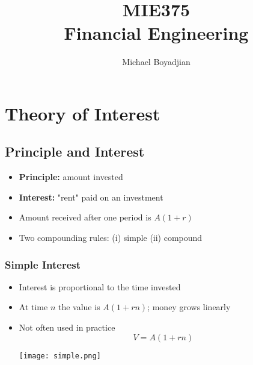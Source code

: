 \documentclass[11pt]{article}
\begin{document}
\title{MIE375  \\ Financial Engineering}
\author{Michael Boyadjian}
\maketitle
\pagebreak

\tableofcontents

\pagebreak

\bigskip
\bigskip
\bigskip

\section{Theory of Interest}

\subsection{Principle and Interest}
\begin{itemize}
\item \textbf{Principle:} amount invested
\item\textbf{Interest: }"rent" paid on an investment
\item Amount received after one period is $A(1+r)$
\item Two compounding rules: (i) simple (ii) compound
\end{itemize}

\subsubsection{Simple Interest}
\begin{itemize}
\item Interest is proportional to the time invested
\item At time $n$ the value is $A(1+rn)$; money grows linearly
\item Not often used in practice
$$ V = A(1+rn)$$
\begin{center}
\texttt{[image: simple.png]} 
\end{center}
\end{itemize}
\end{document}
